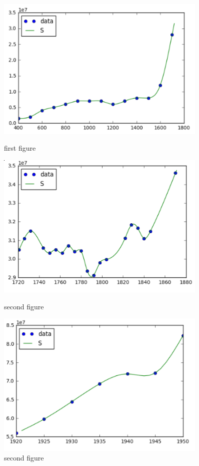 \documentclass[12pt]{article}
\begin{document}
\begin{figure}[h]
	\centering
	\begin{minipage}{0.33\textwidth}
		\centering
		\includegraphics[width=0.9\textwidth]{spline1} %
		\caption{first figure}
	\end{minipage}\hfill
	\begin{minipage}{0.33\textwidth}
		\centering
		\includegraphics[width=0.9\textwidth]{spline2} %
		\caption{second figure}
	\end{minipage}
	\begin{minipage}{0.33\textwidth}
		\centering
		\includegraphics[width=0.9\textwidth]{spline3} %
		\caption{second figure}
	\end{minipage}
\end{figure}
\end{document}
